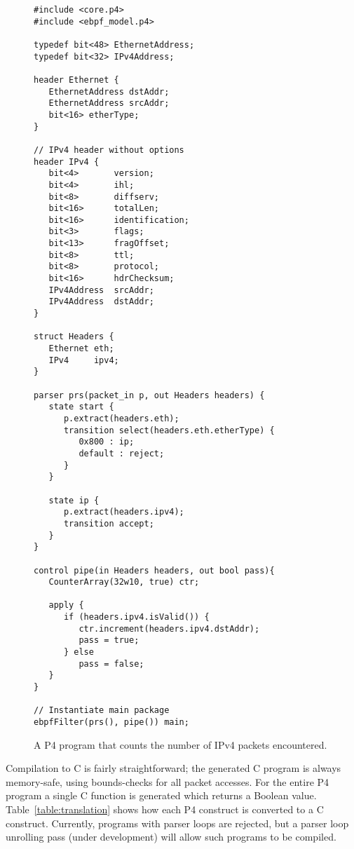 \begin{figure}
\begin{lstlisting}
#include <core.p4>
#include <ebpf_model.p4>

typedef bit<48> EthernetAddress;
typedef bit<32> IPv4Address;

header Ethernet {
   EthernetAddress dstAddr;
   EthernetAddress srcAddr;
   bit<16> etherType;
}

// IPv4 header without options
header IPv4 {
   bit<4>       version;
   bit<4>       ihl;
   bit<8>       diffserv;
   bit<16>      totalLen;
   bit<16>      identification;
   bit<3>       flags;
   bit<13>      fragOffset;
   bit<8>       ttl;
   bit<8>       protocol;
   bit<16>      hdrChecksum;
   IPv4Address  srcAddr;
   IPv4Address  dstAddr;
}

struct Headers {
   Ethernet eth;
   IPv4     ipv4;
}

parser prs(packet_in p, out Headers headers) {
   state start {
      p.extract(headers.eth);
      transition select(headers.eth.etherType) {
         0x800 : ip;
         default : reject;
      }
   }

   state ip {
      p.extract(headers.ipv4);
      transition accept;
   }
}

control pipe(in Headers headers, out bool pass){
   CounterArray(32w10, true) ctr;

   apply {
      if (headers.ipv4.isValid()) {
         ctr.increment(headers.ipv4.dstAddr);
         pass = true;
      } else
         pass = false;
   }
}

// Instantiate main package
ebpfFilter(prs(), pipe()) main;
\end{lstlisting}
\caption{A P4 program that counts the number of IPv4 packets
  encountered.}\label{fig:count}
\end{figure}

Compilation to C is fairly straightforward; the generated C program is
always memory-safe, using bounds-checks for all packet accesses.  For
the entire P4 program a single C function is generated which returns a
Boolean value.  Table~\ref{table:translation} shows how each P4
construct is converted to a C construct.  Currently, programs with
parser loops are rejected, but a parser loop unrolling pass (under
development) will allow such programs to be compiled.

